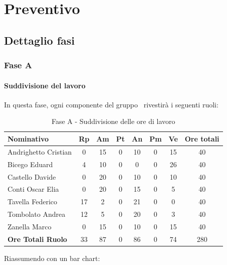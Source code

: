 \documentclass[../PianoProgetto.tex]{subfiles}
\begin{document}
	\section{Preventivo}
		\subsection{Dettaglio fasi}
			\subsubsection{Fase A}
				\paragraph{Suddivisione del lavoro}
					In questa fase\g , ogni componente del gruppo \leaf\ rivestirà i seguenti ruoli:
	
	\begin{table}[h]
		\begin{tabularx}{\textwidth}{l  * {6}{C}  c}
			\toprule
			\textbf{Nominativo} & \textbf{Rp} & \textbf{Am} & \textbf{Pt} 
						& \textbf{An} & \textbf{Pm} & \textbf{Ve} & \textbf{Ore totali} \\
			\midrule
			Andrighetto Cristian & 0 & 15 &	0 &	10 & 0 & 15 & 40 \\
			Bicego Eduard & 4 & 10 & 0 & 0 & 0 & 26 & 40 \\
			Castello Davide &	0 &	20 &	0 &	10 & 0 &	10 & 40 \\
			Conti Oscar Elia & 0 & 20 &	0 &	15 & 0 & 5 & 40 \\
			Tavella Federico &	17 & 2 & 0 & 21 & 0 & 0 & 40 \\
			Tombolato Andrea & 12 & 5 &	0 &	20 & 0 & 3 & 40 \\
			Zanella Marco & 0 & 15 & 0 & 10 & 0 & 15 & 40 \\
			\midrule			
			\textbf{Ore Totali Ruolo} & 33 & 87 & 0 & 86 &	0 &	74 & 280 \\
			\bottomrule
		\end{tabularx}
		\caption{Fase A - Suddivisione delle ore di lavoro}
		\label{tab:faseA_ore}
	\end{table}

\vfill
Riassumendo con un bar chart:	
	
\end{document}
